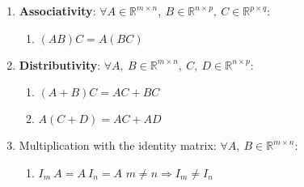 \begin{enumerate}[itemsep=0.2cm]
    \item \textbf{Associativity}: 
    $
        \forall 
        A\in \mathbb{R}^{m\times n},\ 
        B\in \mathbb{R}^{n\times p},\ 
        C \in \mathbb{R}^{p\times q}
    $:
    
        \begin{enumerate}
            \item $(AB)C = A(BC)$
            \hfill \cite{mfml/book/mml/Deisenroth-Faisal-Ong}
        \end{enumerate}

    \item \textbf{Distributivity}: 
    $
        \forall 
        A,\ B\in \mathbb{R}^{m\times n},\ 
        C,\ D\in \mathbb{R}^{n\times p}
    $:

        \begin{enumerate}
            \item $(A + B)C = AC + BC$
            \hfill \cite{mfml/book/mml/Deisenroth-Faisal-Ong}
            
            \item $A(C + D) = AC + AD$
            \hfill \cite{mfml/book/mml/Deisenroth-Faisal-Ong}
        \end{enumerate}

    \item Multiplication with the identity matrix: 
    $
        \forall 
        A,\ B\in \mathbb{R}^{m\times n}
    $:
        \begin{enumerate}
            \item $I_m\ A = A\ I_n = A$
            \hfill $m\neq n \Rightarrow I_m \neq I_n$
            \hfill \cite{mfml/book/mml/Deisenroth-Faisal-Ong}

            
        \end{enumerate}
\end{enumerate}










